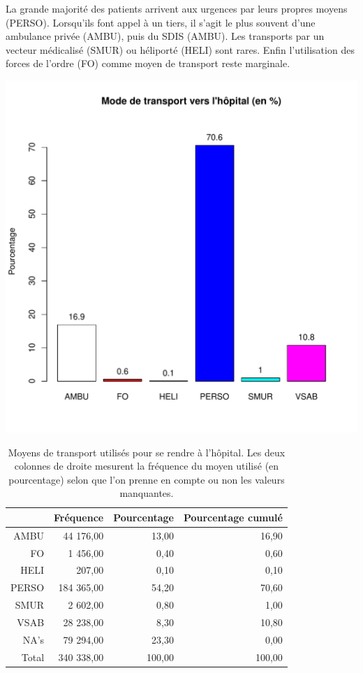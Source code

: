 \documentclass[12pt,english,french,twoside]{book}\usepackage[]{graphicx}\usepackage[]{color}
\makeatletter
\def\maxwidth{ %
  \ifdim\Gin@nat@width>\linewidth
    \linewidth
  \else
    \Gin@nat@width
  \fi
}
\makeatother
\begin{document}
La grande majorité des patients arrivent aux urgences par leurs propres moyens (PERSO). Lorsqu'ils font appel à un tiers, il s'agit le plus souvent d'une ambulance privée (AMBU), puis du SDIS (AMBU). Les transports par un vecteur médicalisé (SMUR) ou héliporté (HELI) sont rares. Enfin l'utilisation des forces de l'ordre (FO) comme moyen de transport reste marginale.


\includegraphics[width=\maxwidth]{figure/transport} 
\begin{table}[ht]
\centering
\begin{tabular}{rrrr}
  \hline
 & Fréquence & Pourcentage & Pourcentage cumulé \\ 
  \hline
AMBU & 44 176,00 & 13,00 & 16,90 \\ 
  FO & 1 456,00 & 0,40 & 0,60 \\ 
  HELI & 207,00 & 0,10 & 0,10 \\ 
  PERSO & 184 365,00 & 54,20 & 70,60 \\ 
  SMUR & 2 602,00 & 0,80 & 1,00 \\ 
  VSAB & 28 238,00 & 8,30 & 10,80 \\ 
  NA's & 79 294,00 & 23,30 & 0,00 \\ 
    Total & 340 338,00 & 100,00 & 100,00 \\ 
   \hline
\end{tabular}
\caption[Moyens de transport]{Moyens de transport utilisés pour se rendre à l'hôpital. Les deux colonnes de droite mesurent la fréquence du moyen utilisé (en pourcentage) selon que l'on prenne en compte ou non les valeurs manquantes. } 
\label{transport}
\end{table}
\end{document}
